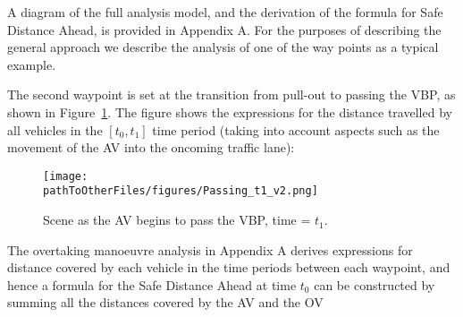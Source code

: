 A diagram of the full analysis model, and the derivation of the formula for Safe Distance Ahead, is provided in %
Appendix A. For the purposes of describing the general approach we describe the analysis of one of the way points as a typical example. 

The second waypoint is set at the transition from pull-out to passing the VBP, as shown in Figure~\ref{fig:Passing_t1}. The figure shows the expressions for the distance travelled by all vehicles in the \textit{$[t_0, t_1]$} time period (taking into account aspects such as the movement of the AV into the oncoming traffic lane):
 \begin{figure}
    \centering
    \texttt{[image: \\pathToOtherFiles/figures/Passing\_t1\_v2.png]}
    \caption{Scene as the AV begins to pass the VBP, time = $t_1$.}
    \label{fig:Passing_t1}
 \end{figure}

The overtaking manoeuvre analysis in Appendix A%
derives expressions for distance covered by each vehicle in the time periods between each waypoint, and hence a formula for the Safe Distance Ahead at time $t_0$ can be constructed by summing all the distances covered by the AV and the OV

